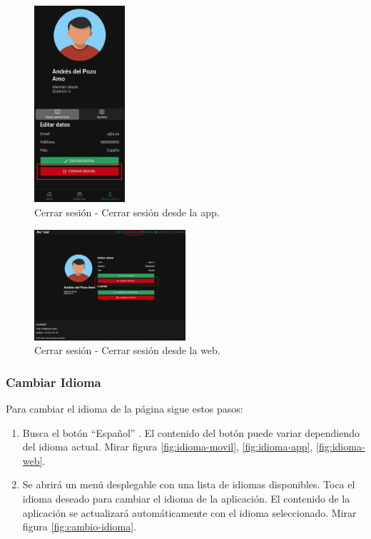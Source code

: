 \begin{figure}[H]
\begin{minipage}{0.45\textwidth}
		\includegraphics[width=0.3\textwidth]{7-Construccion/Manuales/app/P2-CerrarSesion.png}
		\caption{Cerrar sesión - Cerrar sesión desde la app.}
		\label{fig:cuenta-app}
	\end{minipage}
\end{figure}

\begin{figure}[H]
	\centering
	\includegraphics[width=0.5\textwidth]{7-Construccion/Manuales/web/cerrar sesion.png}
	\caption{Cerrar sesión - Cerrar sesión desde la web.}
	\label{fig:cuenta-web}
\end{figure}

\subsubsection{Cambiar Idioma}
Para cambiar el idioma de la página sigue estos pasos:
\begin{enumerate}
	\item Busca el botón “Español” . El contenido del botón puede variar dependiendo del idioma actual. Mirar figura \ref{fig:idioma-movil}, \ref{fig:idioma-app}, \ref{fig:idioma-web}.

	\item Se abrirá un menú desplegable con una lista de idiomas disponibles. Toca el idioma deseado para cambiar el idioma de la aplicación.
	      El contenido de la aplicación se actualizará automáticamente con el idioma seleccionado. Mirar figura \ref{fig:cambio-idioma}.

\end{enumerate}

